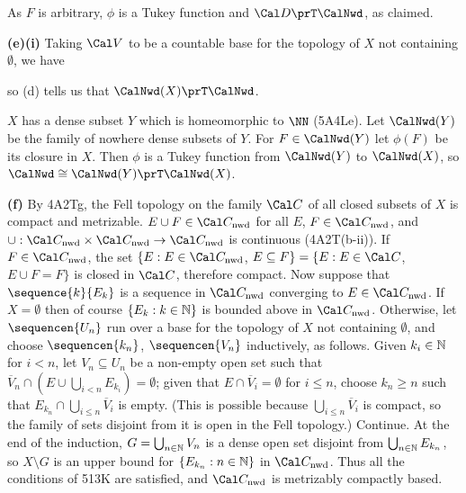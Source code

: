 {As $F$ is arbitrary, $\phi$ is a Tukey function and $\Cal D\prT\CalNwd$,
as claimed.

\medskip

{\bf (e)(i)} Taking $\Cal V$ to be a countable base for the topology of $X$
not containing $\emptyset$, we have


\noindent so (d) tells us that $\CalNwd(X)\prT\CalNwd$.

\medskip

 $X$ has a dense subset $Y$ which is
homeomorphic to $\NN$ (5A4Le).   Let $\CalNwd(Y)$ be the family of nowhere
dense subsets of $Y$.   For $F\in\CalNwd(Y)$ let $\phi(F)$ be its closure in
$X$.   Then $\phi$ is a Tukey function from $\CalNwd(Y)$ to $\CalNwd(X)$, so
$\CalNwd\cong\CalNwd(Y)\prT\CalNwd(X)$.

\medskip

{\bf (f)} By 4A2Tg,
the Fell topology on the family $\Cal C$ of all closed subsets of $X$
is compact and metrizable.   $E\cup F\in\Cal C_{\text{nwd}}$ for all $E$,
$F\in\Cal C_{\text{nwd}}$, and
$\cup:\Cal C_{\text{nwd}}\times\Cal C_{\text{nwd}}\to\Cal C_{\text{nwd}}$
is continuous (4A2T(b-ii)).   If $F\in\Cal C_{\text{nwd}}$, the set
$\{E:E\in\Cal C_{\text{nwd}}$, $E\subseteq F\}
=\{E:E\in\Cal C$, $E\cup F=F\}$ is closed in $\Cal C$, therefore compact.
Now suppose that $\sequence{k}{E_k}$ is a sequence in $\Cal C_{\text{nwd}}$
converging to $E\in\Cal C_{\text{nwd}}$.   If $X=\emptyset$ then of course
$\{E_k:k\in\Bbb N\}$ is bounded above in $\Cal C_{\text{nwd}}$.
Otherwise, let $\sequencen{U_n}$ run over a base for the topology of $X$
not containing $\emptyset$, and choose $\sequencen{k_n}$, $\sequencen{V_n}$
inductively, as follows.   Given $k_i\in\Bbb N$ for $i<n$, let
$V_n\subseteq U_n$ be a non-empty open set such that
$\overline{V}_n\cap(E\cup\bigcup_{i<n}E_{k_i})=\emptyset$;  given that
$E\cap\overline{V}_i=\emptyset$ for $i\le n$, choose $k_n\ge n$ such that
$E_{k_n}\cap\bigcup_{i\le n}\overline{V}_i$ is empty.   (This is possible
because $\bigcup_{i\le n}\overline{V}_i$ is compact, so the family of
sets disjoint from it is open in the Fell topology.)   Continue.   At
the end of the induction, $G=\bigcup_{n\in\Bbb N}V_n$ is a dense open set
disjoint from $\bigcup_{n\in\Bbb N}E_{k_n}$, so $X\setminus G$ is an upper
bound for $\{E_{k_n}:n\in\Bbb N\}$ in $\Cal C_{\text{nwd}}$.   Thus all the
conditions of 513K are satisfied, and $\Cal C_{\text{nwd}}$ is metrizably
compactly based.
}%

